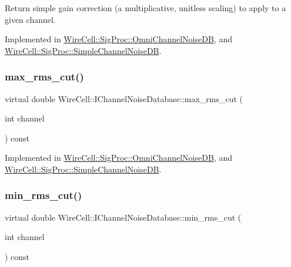 Return simple gain correction (a multiplicative, unitless scaling) to apply to a given channel. 

Implemented in \hyperlink{class_wire_cell_1_1_sig_proc_1_1_omni_channel_noise_d_b_a60802eabcf081d7b82ed7b270dcefe00}{Wire\+Cell\+::\+Sig\+Proc\+::\+Omni\+Channel\+Noise\+DB}, and \hyperlink{class_wire_cell_1_1_sig_proc_1_1_simple_channel_noise_d_b_a7b4f5283401aa1668adda46ba52b06c6}{Wire\+Cell\+::\+Sig\+Proc\+::\+Simple\+Channel\+Noise\+DB}.

\mbox{\label{class_wire_cell_1_1_i_channel_noise_database_ad5e4a49ff6b257e2ef290eeeaba95da7}} 
\subsubsection{\texorpdfstring{max\+\_\+rms\+\_\+cut()}{max\_rms\_cut()}}
{\footnotesize\ttfamily virtual double Wire\+Cell\+::\+I\+Channel\+Noise\+Database\+::max\+\_\+rms\+\_\+cut (\begin{DoxyParamCaption}\item[{int}]{channel }\end{DoxyParamCaption}) const\hspace{0.3cm}{\ttfamily [pure virtual]}}



Implemented in \hyperlink{class_wire_cell_1_1_sig_proc_1_1_omni_channel_noise_d_b_a494d0e48066357d8e86ea7ce4d462bdb}{Wire\+Cell\+::\+Sig\+Proc\+::\+Omni\+Channel\+Noise\+DB}, and \hyperlink{class_wire_cell_1_1_sig_proc_1_1_simple_channel_noise_d_b_a22eaf2783321cb45cd904f97de2ba7d3}{Wire\+Cell\+::\+Sig\+Proc\+::\+Simple\+Channel\+Noise\+DB}.

\mbox{\label{class_wire_cell_1_1_i_channel_noise_database_ad0e7e7c3424260af2bd426e578ad83f6}} 
\subsubsection{\texorpdfstring{min\+\_\+rms\+\_\+cut()}{min\_rms\_cut()}}
{\footnotesize\ttfamily virtual double Wire\+Cell\+::\+I\+Channel\+Noise\+Database\+::min\+\_\+rms\+\_\+cut (\begin{DoxyParamCaption}\item[{int}]{channel }\end{DoxyParamCaption}) const\hspace{0.3cm}{\ttfamily [pure virtual]}}



